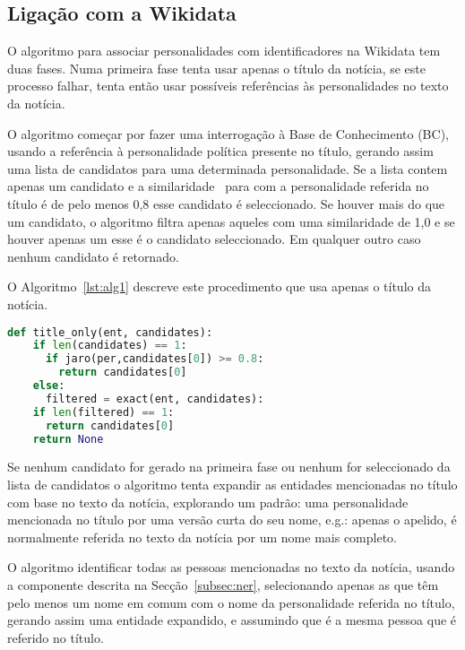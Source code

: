 \documentclass[a4paper, twocolumn, 11pt, twoside]{article}
\begin{document}
\subsection{Ligação com a Wikidata}
\label{subsec:ent_linking}

O algoritmo para associar personalidades com identificadores na Wikidata tem duas fases. Numa primeira fase tenta usar apenas o título da notícia, se este processo falhar, tenta então usar possíveis referências às personalidades no texto da notícia.

O algoritmo começar por fazer uma interrogação à Base de Conhecimento (BC), usando a referência à personalidade política presente no título, gerando assim uma lista de candidatos para uma determinada personalidade. Se a lista contem apenas um candidato e a similaridade~\citep{jaro1989} para com a personalidade referida no título é de pelo menos 0,8 esse candidato é seleccionado. Se houver mais do que um candidato, o algoritmo filtra apenas aqueles com uma similaridade de 1,0 e se houver apenas um esse é o candidato seleccionado. Em qualquer outro caso nenhum candidato é retornado. 

O Algoritmo~\ref{lst:alg1} descreve este procedimento que usa apenas o título da notícia.

\begin{lstlisting}[language=python,columns=fullflexible,frame=single,label={lst:alg1},title={Algoritmo 6.1. Ligação com a Wikidata usando apenas o título.},captionpos=b]
def title_only(ent, candidates):
    if len(candidates) == 1:
      if jaro(per,candidates[0]) >= 0.8:
        return candidates[0]
    else:
      filtered = exact(ent, candidates):
	if len(filtered) == 1:
	  return candidates[0]
    return None
\end{lstlisting}

Se nenhum candidato for gerado na primeira fase ou nenhum for seleccionado da lista de candidatos o algoritmo tenta expandir as entidades mencionadas no título com base no texto da notícia, explorando um padrão: uma personalidade mencionada no título por uma versão curta do seu nome, e.g.: apenas o apelido, é normalmente referida no texto da notícia por um nome mais completo.

O algoritmo identificar todas as pessoas mencionadas no texto da notícia, usando a componente descrita na Secção~\ref{subsec:ner}, selecionando apenas as que têm pelo menos um nome em comum com o nome da personalidade referida no título, gerando assim uma entidade expandido, e assumindo que é a mesma pessoa que é referido no título.
\end{document}
